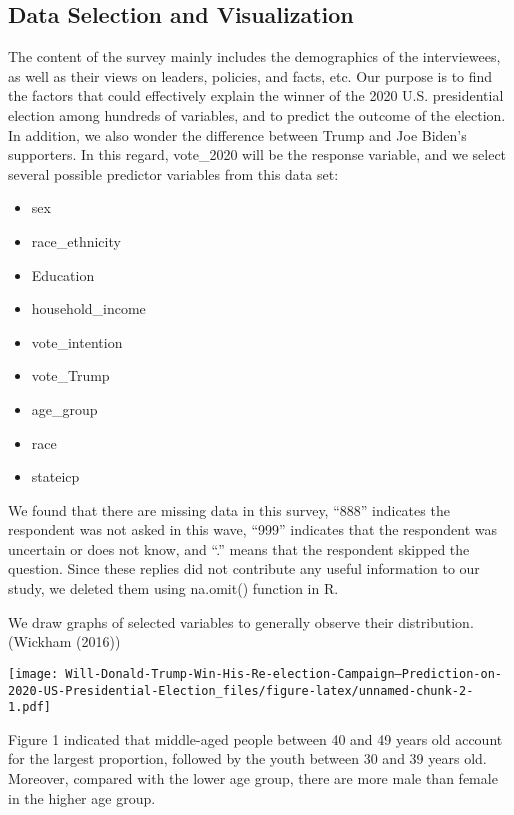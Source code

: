\documentclass[
]{article}
\providecommand{\tightlist}{%
  \setlength{\itemsep}{0pt}\setlength{\parskip}{0pt}}
\begin{document}
\hypertarget{data-selection-and-visualization}{%
\subsection{Data Selection and
Visualization}\label{data-selection-and-visualization}}

The content of the survey mainly includes the demographics of the
interviewees, as well as their views on leaders, policies, and facts,
etc. Our purpose is to find the factors that could effectively explain
the winner of the 2020 U.S. presidential election among hundreds of
variables, and to predict the outcome of the election. In addition, we
also wonder the difference between Trump and Joe Biden's supporters. In
this regard, vote\_2020 will be the response variable, and we select
several possible predictor variables from this data set:

\begin{itemize}
\tightlist
\item
  sex
\item
  race\_ethnicity
\item
  Education
\item
  household\_income\\
\item
  vote\_intention
\item
  vote\_Trump
\item
  age\_group\\
\item
  race
\item
  stateicp
\end{itemize}

We found that there are missing data in this survey, ``888'' indicates
the respondent was not asked in this wave, ``999'' indicates that the
respondent was uncertain or does not know, and ``.'' means that the
respondent skipped the question. Since these replies did not contribute
any useful information to our study, we deleted them using na.omit()
function in R.

We draw graphs of selected variables to generally observe their
distribution.(Wickham (2016))

\texttt{[image: Will-Donald-Trump-Win-His-Re-election-Campaign--Prediction-on-2020-US-Presidential-Election\_files/figure-latex/unnamed-chunk-2-1.pdf]}

Figure 1 indicated that middle-aged people between 40 and 49 years old
account for the largest proportion, followed by the youth between 30 and
39 years old. Moreover, compared with the lower age group, there are
more male than female in the higher age group.
\end{document}
